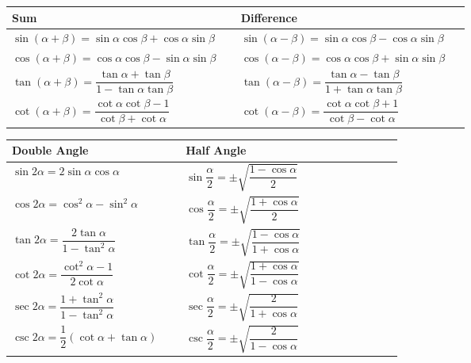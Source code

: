 \documentclass[11pt, a4paper]{article}
\begin{document}
\begin{center}
\begin{tabular}{@{}p{0.47\linewidth} p{0.47\linewidth}@{}}
\toprule
\textbf{Sum} & \textbf{Difference} \\
\midrule
$\sin(\alpha+\beta)=\sin\alpha\cos\beta+\cos\alpha\sin\beta$ & $\sin(\alpha-\beta)=\sin\alpha\cos\beta-\cos\alpha\sin\beta$ \\[2mm]
$\cos(\alpha+\beta)=\cos\alpha\cos\beta-\sin\alpha\sin\beta$ & $\cos(\alpha-\beta)=\cos\alpha\cos\beta+\sin\alpha\sin\beta$ \\[2mm]
$\tan(\alpha+\beta)=\dfrac{\tan\alpha+\tan\beta}{1-\tan\alpha\tan\beta}$ & $\tan(\alpha-\beta)=\dfrac{\tan\alpha-\tan\beta}{1+\tan\alpha\tan\beta}$ \\[3mm]
$\cot(\alpha+\beta)=\dfrac{\cot\alpha\cot\beta-1}{\cot\beta+\cot\alpha}$ & $\cot(\alpha-\beta)=\dfrac{\cot\alpha\cot\beta+1}{\cot\beta-\cot\alpha}$ \\
\bottomrule
\end{tabular}
\end{center}

\begin{center}
\begin{tabular}{@{}p{0.4\linewidth} p{0.5\linewidth}@{}}
\toprule
\textbf{Double Angle} & \textbf{Half Angle} \\
\midrule
$\sin 2\alpha = 2\sin\alpha\cos\alpha$
& $\sin\dfrac{\alpha}{2} = \pm\sqrt{\dfrac{1-\cos\alpha}{2}}$ \\[3mm]

$\cos 2\alpha = \cos^2\alpha - \sin^2\alpha$
& $\cos\dfrac{\alpha}{2} = \pm\sqrt{\dfrac{1+\cos\alpha}{2}}$ \\[3mm]

$\tan 2\alpha = \dfrac{2\tan\alpha}{1-\tan^2\alpha}$
& $\tan\dfrac{\alpha}{2} = \pm\sqrt{\dfrac{1-\cos\alpha}{1+\cos\alpha}}$ \\[3mm]

$\cot 2\alpha = \dfrac{\cot^2\alpha-1}{2\cot\alpha}$
& $\cot\dfrac{\alpha}{2} = \pm\sqrt{\dfrac{1+\cos\alpha}{1-\cos\alpha}}$ \\[3mm]

$\sec 2\alpha = \dfrac{1+\tan^2\alpha}{1-\tan^2\alpha}$
& $\sec\dfrac{\alpha}{2} = \pm\sqrt{\dfrac{2}{1+\cos\alpha}}$ \\[3mm]

$\csc 2\alpha = \dfrac{1}{2}\left(\cot\alpha+\tan\alpha\right)$
& $\csc\dfrac{\alpha}{2} = \pm\sqrt{\dfrac{2}{1-\cos\alpha}}$ \\

\bottomrule
\end{tabular}
\end{center}
\end{document}
